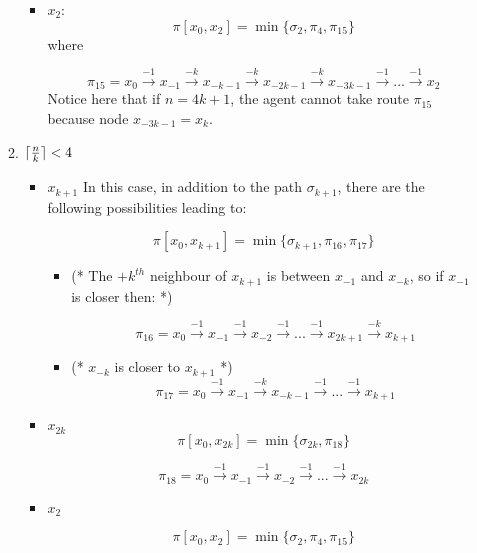 \begin{itemize}
\begin{enumerate}
\begin{itemize}
\item $x_{2}$:
 $$ \pi[x_0,x_{2}] = \min \{   \sigma_{2},\pi_{4},\pi_{15}\}$$
where

 
$$\pi_{15} = x_{0} \xrightarrow {-1} x_{-1} \xrightarrow {-k} x_{-k-1} \xrightarrow {-k}x_{-2k-1} \xrightarrow {-k} x_{-3k-1}\xrightarrow {-1} ... \xrightarrow {-1} x_{2}$$
Notice here that if $n=4k+1$, the agent cannot take   route $\pi_{15}$ 
 because node $x_{-3k-1} =x_{k}$. 

\end{itemize}

 \item  $\lceil {n \over k} \rceil<  4$ \\
\begin{itemize}


 \item $x_{k+1}$  
In this case, in addition to the path $\sigma_{k+1}$, there are the following possibilities leading to:

  $$ \pi[x_0,x_{k+1}] = \min \{   \sigma_{k+1}, \pi_{16}, \pi_{17}\}$$

\begin{itemize}
\item  (* The $+k^{th}$ neighbour of $x_{k+1}$  is between $x_{-1}$ and $x_{-k}$, so 
if $x_{-1}$ is closer then: *)

   $$\pi_{16} = x_{0} \xrightarrow {-1} x_{-1} \xrightarrow {-1} x_{-2} \xrightarrow {-1} ... \xrightarrow {-1} x_{2k+1}\xrightarrow {-k} x_{k+1}$$ %

 \item (*  $x_{-k}$  is closer to $x_{k+1}$  *)
$$\pi_{17} = x_{0} \xrightarrow {-1} x_{-1} \xrightarrow {-k} x_{-k-1} \xrightarrow {-1} ... \xrightarrow {-1} x_{k+1}$$ 
\end{itemize}


 \item $x_{2k}$
   $$ \pi[x_0,x_{2k}] = \min \{   \sigma_{2k}, \pi_{18}\}$$

 
$$ \pi_{18} = x_{0} \xrightarrow {-1} x_{-1} \xrightarrow {-1} x_{-2} \xrightarrow {-1} ... \xrightarrow {-1} x_{2k}$$ %
 
 
 \item $x_{2}$
 
   $$ \pi[x_0,x_{2}] = \min \{   \sigma_{2},\pi_{4},\pi_{15}\}$$




\end{itemize}

\end{enumerate}
\end{itemize}

